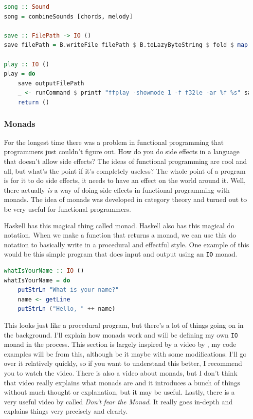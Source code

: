 \documentclass[11pt]{article}
\begin{document}
\begin{lstlisting}[language=Haskell, basicstyle=\tiny]
song :: Sound
song = combineSounds [chords, melody]

save :: FilePath -> IO ()
save filePath = B.writeFile filePath $ B.toLazyByteString $ fold $ map B.floatLE song

play :: IO ()
play = do
    save outputFilePath
    _ <- runCommand $ printf "ffplay -showmode 1 -f f32le -ar %f %s" sampleRate outputFilePath
    return ()
\end{lstlisting}

\subsubsection{Monads}\label{monads}

For the longest time there was a problem in functional programming that
programmers just couldn't figure out. How do you do side effects in a language
that doesn't allow side effects? The ideas of functional programming are cool
and all, but what's the point if it's completely useless? The whole point of a
program is for it to do side effects, it needs to have an effect on the world
around it. Well, there actually \emph{is} a way of doing side effects in
functional programming with monads. The idea of monads was developed in
category theory and turned out to be very useful for functional programmers.

Haskell has this magical thing called monad. Haskell also has this magical do
notation. When we make a function that returns a monad, we can use this do
notation to basically write in a procedural and effectful style. One example of
this would be this simple program that does input and output using an
\texttt{IO} monad.

\begin{lstlisting}[language=Haskell]
whatIsYourName :: IO ()
whatIsYourName = do
    putStrLn "What is your name?"
    name <- getLine
    putStrLn ("Hello, " ++ name)
\end{lstlisting}

This looks just like a procedural program, but there's a lot of things going on
in the background. I'll explain how monads work and will be defining my own
\texttt{IO} monad in the process. This section is largely inspired by a video
by \textcite{tsmonad}, my code examples will be from this, although be it maybe
with some modifications. I'll go over it relatively quickly, so if you want to
understand this better, I recommend you to watch the video. There is also a
\textcite{cpmonad} video about monads, but I don't think that video really
explains what monads are and it introduces a bunch of things without much
thought or explanation, but it may be useful. Lastly, there is a very useful
video by \textcite{beckman2012} called \emph{Don't fear the Monad}. It really
goes in-depth and explains things very precisely and clearly.
\end{document}
